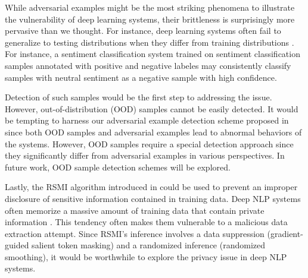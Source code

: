 While adversarial examples might be the most striking phenomena to illustrate the vulnerability of deep learning systems, their brittleness is surprisingly more pervasive than we thought. For instance, deep learning systems often fail to generalize to testing distributions when they differ from training distributions \citep{hendrycks17baseline}. For instance, a sentiment classification system trained on sentiment classification samples annotated with positive and negative labeles may consistently classify samples with neutral sentiment as a negative sample with high confidence. 

Detection of such samples would be the first step to addressing the issue. However, out-of-distribution (OOD) samples cannot be easily detected. It would be tempting to harness our adversarial example detection scheme proposed in  since both OOD samples and adversarial examples lead to abnormal behaviors of the systems. However, OOD samples require a special detection approach since they significantly differ from adversarial examples in various perspectives. In future work, OOD sample detection schemes will be explored.

Lastly, the RSMI algorithm introduced in  could be used to prevent an improper disclosure of sensitive information contained in training data. Deep NLP systems often memorize a massive amount of training data that contain private information \citep{carlini21extracting}. This tendency often makes them vulnerable to a malicious data extraction attempt. Since RSMI's inference involves a data suppression (\ie gradient-guided salient token masking) and a randomized inference (\ie randomized smoothing), it would be worthwhile to explore the privacy issue in deep NLP systems.





